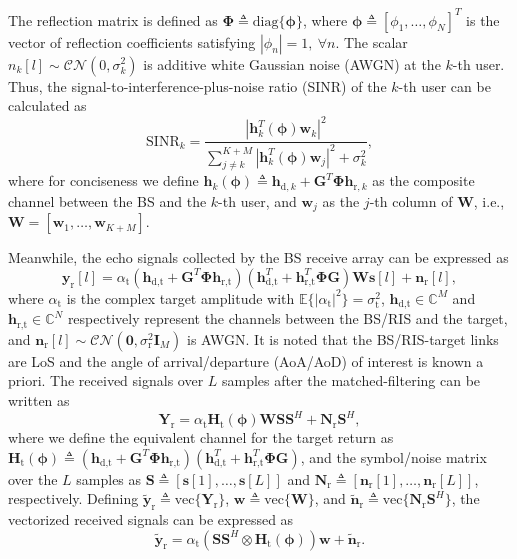 \documentclass[Conference,a4paper]{IEEEtran}
\newcommand{\be}{\begin{equation}}
\newcommand{\ee}{\end{equation}}
\begin{document}
The reflection matrix is defined as $\bm{\Phi}\triangleq\text{diag}\{\bm{\phi}\}$, where $\bm{\phi}\triangleq[\phi_1,\ldots,\phi_N]^T$ is the vector of reflection coefficients satisfying $|\phi_n|=1,~\forall n$.
The scalar $n_k[l]\sim\mathcal{CN}(0,\sigma_k^2)$ is additive white Gaussian noise (AWGN) at the $k$-th user.
Thus, the signal-to-interference-plus-noise ratio (SINR) of the $k$-th user can be calculated as\vspace{-0.1 cm}
\be
\text{SINR}_k = \frac{|\mathbf{h}^T_k(\bm{\phi})\mathbf{w}_k|^2}
{\sum_{j\neq k}^{K+M}|\mathbf{h}^T_k(\bm{\phi})\mathbf{w}_j|^2+\sigma_k^2},
\ee
where for conciseness we define $\mathbf{h}_k(\bm{\phi}) \triangleq \mathbf{h}_{\text{d},k} + \mathbf{G}^T\bm{\Phi}\mathbf{h}_{\text{r},k}$ as the composite channel between the BS and the $k$-th user, and $\mathbf{w}_j$ as the $j$-th column of $\mathbf{W}$, i.e., $\mathbf{W} = [\mathbf{w}_1,\ldots,\mathbf{w}_{K+M}]$.


Meanwhile, the echo signals collected by the BS receive array can be expressed as
\be
\mathbf{y}_\text{r}[l]  = \alpha_\text{t}(\mathbf{h}_{\text{d},\text{t}} + \mathbf{G}^T\bm{\Phi}\mathbf{h}_{\text{r},\text{t}})(\mathbf{h}^T_{\text{d},\text{t}} + \mathbf{h}^T_{\text{r},\text{t}}\bm{\Phi}\mathbf{G})\mathbf{W}\mathbf{s}[l] + \mathbf{n}_\text{r}[l],
\ee
where $\alpha_\text{t}$ is the complex target amplitude with $\mathbb{E}\{|\alpha_\text{t}|^2\}=\sigma_\text{t}^2$, $\mathbf{h}_{\text{d},\text{t}}\in\mathbb{C}^M$ and $\mathbf{h}_{\text{r},\text{t}}\in\mathbb{C}^N$ respectively represent the channels between the BS/RIS and the target, and $\mathbf{n}_\text{r}[l]\sim\mathcal{CN}(\mathbf{0},\sigma_\text{r}^2\mathbf{I}_M)$ is AWGN.
It is noted that the BS/RIS-target links are LoS and the angle of arrival/departure (AoA/AoD) of interest is known a priori.
The received signals over $L$ samples after the matched-filtering can be written as\vspace{-0.1 cm}
\be
\mathbf{Y}_\text{r} = \alpha_\text{t}\mathbf{H}_\text{t}(\bm{\phi})\mathbf{WSS}^H + \mathbf{N}_\text{r}\mathbf{S}^H,
\ee
where we define the equivalent channel for the target return as
$\mathbf{H}_\text{t}(\bm{\phi})\triangleq (\mathbf{h}_{\text{d},\text{t}} + \mathbf{G}^T\bm{\Phi}\mathbf{h}_{\text{r},\text{t}})(\mathbf{h}^T_{\text{d},\text{t}} + \mathbf{h}^T_{\text{r},\text{t}}\bm{\Phi}\mathbf{G})$, and the symbol/noise matrix over the $L$ samples as $\mathbf{S} \triangleq [\mathbf{s}[1],\ldots,\mathbf{s}[L]]$ and $\mathbf{N}_\text{r} \triangleq [\mathbf{n}_\text{r}[1],\ldots,\mathbf{n}_\text{r}[L]]$, respectively.
Defining $\widetilde{\mathbf{y}}_\text{r} \triangleq \text{vec}\{\mathbf{Y}_\text{r}\}$, $\mathbf{w} \triangleq \text{vec}\{\mathbf{W}\}$, and $\widetilde{\mathbf{n}}_\text{r} \triangleq \text{vec}\{\mathbf{N}_\text{r}\mathbf{S}^H\}$, the vectorized received signals can be expressed as\vspace{-0.1 cm}
\be
\widetilde{\mathbf{y}}_\text{r}  = \alpha_\text{t}(\mathbf{SS}^H\otimes\mathbf{H}_\text{t}(\bm{\phi}))\mathbf{w}+ \widetilde{\mathbf{n}}_\text{r}.
\ee
\end{document}

